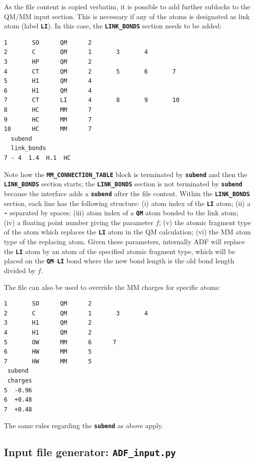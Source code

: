 \documentclass[a4paper,10pt,DIV=15,openany]{scrbook}
\newcommand{\ttt}[1]{\textbf{\texttt{#1}}}
\newenvironment{example}{
  \setlength{\OuterFrameSep}{3pt}
  \vspace{0mm}
  \definecolor{shadecolor}{HTML}{E4F4FF}
  \begin{shaded}
}{
  \end{shaded}
}
\begin{document}
As the file content is copied verbatim, it is possible to add further sublocks to the QM/MM input section.
This is necessary if any of the atoms is designated as link atom (label \ttt{LI}).
In this case, the \ttt{LINK\_BONDS} section needs to be added:
\begin{example}
  \begin{verbatim}
1       SO      QM      2
2       C       QM      1       3       4
3       HP      QM      2
4       CT      QM      2       5       6       7
5       H1      QM      4
6       H1      QM      4
7       CT      LI      4       8       9       10
8       HC      MM      7
9       HC      MM      7
10      HC      MM      7
  subend
  link_bonds
7 - 4  1.4  H.1  HC
\end{verbatim}
\end{example}
Note how the \ttt{MM\_CONNECTION\_TABLE} block is terminated by \ttt{subend} and then the \ttt{LINK\_BONDS} section starts; the \ttt{LINK\_BONDS} section is not terminated by \ttt{subend} because the interface adds a \ttt{subend} after the file content.
Within the \ttt{LINK\_BONDS} section, each line has the following structure: (i) atom index of the \ttt{LI} atom; (ii) a \ttt{-} separated by spaces; (iii) atom index of a \ttt{QM} atom bonded to the link atom; (iv) a floating point number giving the parameter $f$; (v) the atomic fragment type of the atom which replaces the \ttt{LI} atom in the QM calculation; (vi) the MM atom type of the replacing atom.
Given these parameters, internally ADF will replace the \ttt{LI} atom by an atom of the specified atomic fragment type, which will be placed on the \ttt{QM}--\ttt{LI} bond where the new bond length is the old bond length divided by $f$.

The file can also be used to override the MM charges for specific atoms:
\begin{example}
  \begin{verbatim}
1       SO      QM      2
2       C       QM      1       3       4
3       H1      QM      2
4       H1      QM      2
5       OW      MM      6      7
6       HW      MM      5
7       HW      MM      5
 subend
 charges
5  -0.96
6  +0.48
7  +0.48
\end{verbatim}
\end{example}
The same rules regarding the \ttt{subend} as above apply.


\subsection{Input file generator: \ttt{ADF\_input.py}}\label{sec:ADF_input.py}
\end{document}

